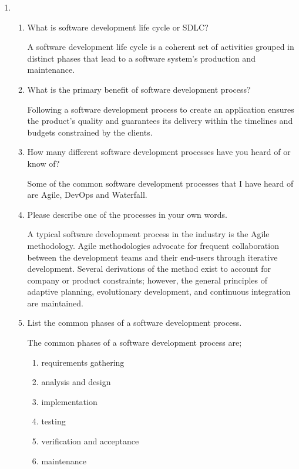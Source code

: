 \documentclass[12pt]{article}
\begin{document}
\begin{enumerate}
    \item
    \begin{enumerate}[start=1,align=left]
      \item What is software development life cycle or SDLC?

      A software development life cycle is a coherent set of activities grouped in distinct phases that lead to a software system's production and maintenance.

      \item What is the primary benefit of software development process?

      Following a software development process to create an application ensures the product's quality and guarantees its delivery within the timelines and budgets constrained by the clients.

      \item How many different software development processes have you heard of or know of?

      Some of the common software development processes that I have heard of are Agile, DevOps and Waterfall.

      \item Please describe one of the processes in your own words.

      A typical software development process in the industry is the Agile methodology. Agile methodologies advocate for frequent collaboration between the development teams and their end-users through iterative development. Several derivations of the method exist to account for company or product constraints; however, the general principles of adaptive planning, evolutionary development, and continuous integration are maintained.

      \item List the common phases of a software development process.

      The common phases of a software development process are;
      \begin{enumerate}
        \item requirements gathering
        \item analysis and design
        \item implementation
        \item testing
        \item verification and acceptance
        \item maintenance
      \end{enumerate}


\end{enumerate}
\end{enumerate}
\end{document}
